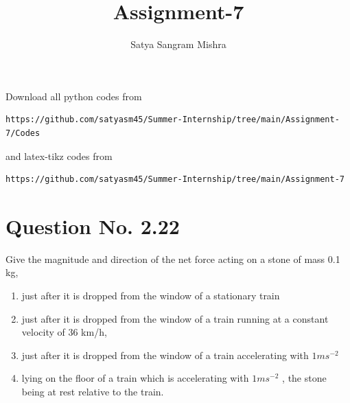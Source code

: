 \documentclass[journal,12pt,twocolumn]{IEEEtran}
\begin{document}
     \def\centbox#1{\makebox[0in]{#1}}
     \def\topbox#1{\raisebox{-\baselineskip}[0in][0in]{#1}}
     \def\midbox#1{\raisebox{-0.5\baselineskip}[0in][0in]{#1}}
\vspace{3cm}
\title{Assignment-7}
\author{Satya Sangram Mishra}
\maketitle
\newpage
\bigskip
\renewcommand{\thefigure}{\theenumi}
\renewcommand{\thetable}{\theenumi}
Download all python codes from 
\begin{lstlisting}
https://github.com/satyasm45/Summer-Internship/tree/main/Assignment-7/Codes
\end{lstlisting}
%
and latex-tikz codes from 
%
\begin{lstlisting}
https://github.com/satyasm45/Summer-Internship/tree/main/Assignment-7
\end{lstlisting}
%
\section{Question No. 2.22}
Give the magnitude and direction of the net
force acting on a stone of mass 0.1 kg,
\begin{enumerate}[label=(\alph*)]
    \item  just after it is dropped from the window of
a stationary train
\item just after it is dropped from the window of
a train running at a constant velocity of 36
km/h,
\item just after it is dropped from the window of
a train accelerating with $1ms^{-2}$
\item lying on the floor of a train which is accelerating with $1ms^{-2}$
, the stone being at rest
relative to the train.
\end{enumerate}

%
\end{document}
